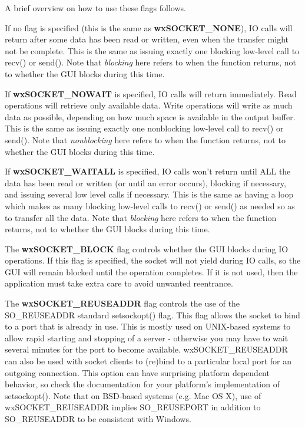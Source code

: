 A brief overview on how to use these flags follows.

If no flag is specified (this is the same as {\bf wxSOCKET\_NONE}),
IO calls will return after some data has been read or written, even
when the transfer might not be complete. This is the same as issuing
exactly one blocking low-level call to recv() or send(). Note
that {\it blocking} here refers to when the function returns, not
to whether the GUI blocks during this time.

If {\bf wxSOCKET\_NOWAIT} is specified, IO calls will return immediately.
Read operations will retrieve only available data. Write operations will
write as much data as possible, depending on how much space is available
in the output buffer. This is the same as issuing exactly one nonblocking
low-level call to recv() or send(). Note that {\it nonblocking} here
refers to when the function returns, not to whether the GUI blocks during
this time.

If {\bf wxSOCKET\_WAITALL} is specified, IO calls won't return until ALL
the data has been read or written (or until an error occurs), blocking if
necessary, and issuing several low level calls if necessary. This is the
same as having a loop which makes as many blocking low-level calls to
recv() or send() as needed so as to transfer all the data. Note
that {\it blocking} here refers to when the function returns, not
to whether the GUI blocks during this time.

The {\bf wxSOCKET\_BLOCK} flag controls whether the GUI blocks during
IO operations. If this flag is specified, the socket will not yield
during IO calls, so the GUI will remain blocked until the operation
completes. If it is not used, then the application must take extra
care to avoid unwanted reentrance.

The {\bf wxSOCKET\_REUSEADDR} flag controls the use of the SO\_REUSEADDR standard
setsockopt() flag. This flag allows the socket to bind to a port that is already in use.
This is mostly used on UNIX-based systems to allow rapid starting and stopping of a server - 
otherwise you may have to wait several minutes for the port to become available.
wxSOCKET\_REUSEADDR can also be used with socket clients to (re)bind to a particular local port
for an outgoing connection.
This option can have surprising platform dependent behavior, so check the documentation for
your platform's implementation of setsockopt(). Note that on BSD-based systems (e.g. Mac OS X),
use of wxSOCKET\_REUSEADDR implies SO\_REUSEPORT in addition to SO\_REUSEADDR to be consistent
with Windows.

